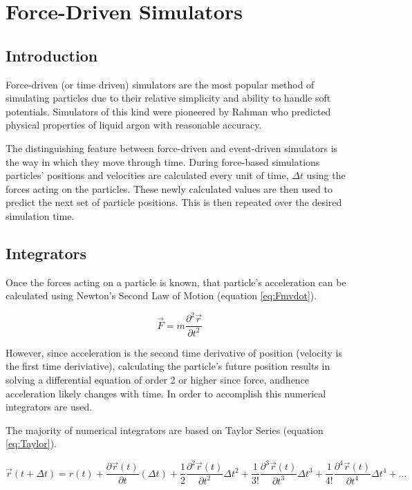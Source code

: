 \documentclass[12pt]{UoAthesis}
\begin{document}
\section{Force-Driven Simulators}
\subsection{Introduction} 
Force-driven (or time driven) simulators are the most popular method
of simulating particles due to their relative simplicity and ability
to handle soft potentials. Simulators of this kind were pioneered by
Rahman \cite{Rahman1964} who predicted physical properties of liquid
argon with reasonable accuracy.

The distinguishing feature between force-driven and event-driven
simulators is the way in which they move through time. During
force-based simulations particles' positions and velocities are
calculated every unit of time, $\Delta t$ using the forces acting on
the particles. These newly calculated values are then used to predict
the next set of particle positions. This is then repeated over the
desired simulation time.

\subsection{Integrators} 
Once the forces acting on a particle is known, that particle's
acceleration can be calculated using Newton's Second Law of Motion
(equation \ref{eq:Fmvdot}).

\begin{equation} 
  \vec{F} = m \frac{\partial^2 \vec{r}}{\partial t^2}
  \label{eq:Fmvdot} 
\end{equation}

However, since acceleration is the second time derivative of position
(velocity is the first time deriviative), calculating the particle's
future position results in solving a differential equation of order 2
or higher since force, andhence acceleration likely changes with
time. In order to accomplish this numerical integrators are used.

The majority of numerical integrators are based on Taylor Series
(equation \ref{eq:Taylor}).

\begin{equation} 
\vec{r}(t+\Delta t) = r(t) + 
\frac{\partial\vec{r}(t)}{\partial t}(\Delta t) + 
\frac{1}{2}\frac{\partial^2\vec{r}(t)}{\partial t^2}\Delta t^2 + 
\frac{1}{3!}\frac{\partial^3\vec{r}(t)}{\partial t^3}\Delta t^3 
+ \frac{1}{4!}\frac{\partial^4\vec{r}(t)}{\partial t^4}\Delta t^4 
+ ... \label{eq:Taylor} 
\end{equation}
\end{document}
